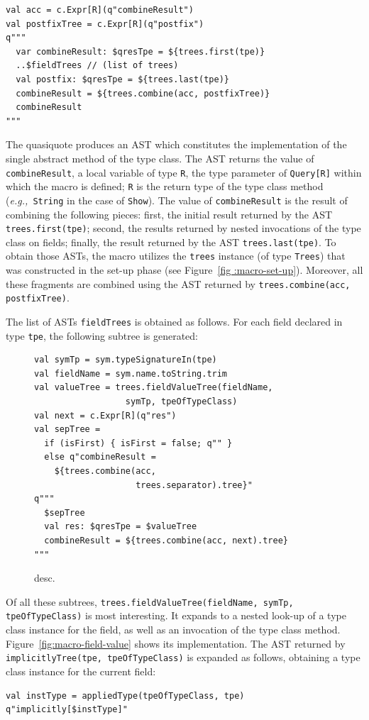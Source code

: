 \documentclass[preprint]{sigplanconf}
\newcommand{\eg}{{\em e.g.,~}}
\begin{document}
\begin{lstlisting}
val acc = c.Expr[R](q"combineResult")
val postfixTree = c.Expr[R](q"postfix")
q"""
  var combineResult: $qresTpe = ${trees.first(tpe)}
  ..$fieldTrees // (list of trees)
  val postfix: $qresTpe = ${trees.last(tpe)}
  combineResult = ${trees.combine(acc, postfixTree)}
  combineResult
"""
\end{lstlisting}
\noindent

The quasiquote produces an AST which constitutes the implementation of the
single abstract method of the type class. The AST returns the value of
\verb|combineResult|, a local variable of type \verb|R|, the type parameter of
\verb|Query[R]| within which the macro is defined; \verb|R| is the return type
of the type class method (\eg \verb|String| in the case of \verb|Show|). The
value of \verb|combineResult| is the result of combining the following pieces:
first, the initial result returned by the AST \verb|trees.first(tpe)|; second,
the results returned by nested invocations of the type class on fields;
finally, the result returned by the AST \verb|trees.last(tpe)|. To obtain
those ASTs, the macro utilizes the \verb|trees| instance (of type
\verb|Trees|) that was constructed in the set-up phase (see Figure~\ref{fig
:macro-set-up}). Moreover, all these fragments are combined using the AST
returned by \verb|trees.combine(acc, postfixTree)|.

The list of ASTs \verb|fieldTrees| is obtained as follows. For each field
declared in type \verb|tpe|, the following subtree is generated:

\begin{figure}
\centering
\begin{lstlisting}
val symTp = sym.typeSignatureIn(tpe)
val fieldName = sym.name.toString.trim
val valueTree = trees.fieldValueTree(fieldName,
                  symTp, tpeOfTypeClass)
val next = c.Expr[R](q"res")
val sepTree =
  if (isFirst) { isFirst = false; q"" }
  else q"combineResult =
    ${trees.combine(acc,
                    trees.separator).tree}"
q"""
  $sepTree
  val res: $qresTpe = $valueTree
  combineResult = ${trees.combine(acc, next).tree}
"""
\end{lstlisting}
  \caption{desc.}
  \label{fig:macro-combine-result}
\end{figure}

Of all these subtrees,
\verb|trees.fieldValueTree(fieldName, symTp, tpeOfTypeClass)| is most interesting.
It expands to a nested look-up of a type class instance for the field, as well as
an invocation of the type class method. Figure~\ref{fig:macro-field-value} shows its implementation.
The AST returned by \verb|implicitlyTree(tpe, tpeOfTypeClass)| is expanded as follows,
obtaining a type class instance for the current field:
\begin{lstlisting}
val instType = appliedType(tpeOfTypeClass, tpe)
q"implicitly[$instType]"
\end{lstlisting}
\end{document}
